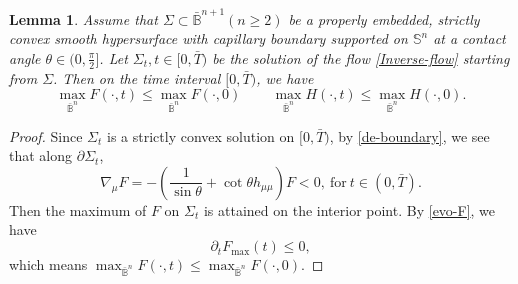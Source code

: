 \documentclass[11pt,reqno]{amsart}
\newtheorem{lem}[thm]{Lemma}
\theoremstyle{definition}
\theoremstyle{remark}
\numberwithin{equation}{section}
\renewcommand{\(}{\left(}
\renewcommand{\)}{\right)}
\renewcommand{\-}{\overline}
\begin{document}
\begin{lem}\label{upper-F-H}
	Assume that $\Sigma\subset\bar{\mathbb{B}}^{n+1} (n\geq 2)$ be a properly embedded, strictly convex smooth hypersurface with capillary boundary supported on $\mathbb{S}^n$ at a contact angle $\theta\in(0,\frac{\pi}{2}]$. Let $\Sigma_t,t\in[0,\bar{T})$ be the solution of the flow \eqref{Inverse-flow} starting from $\Sigma$. Then on the time interval $[0,\bar{T})$, we have
	\begin{equation}
		\max_{\bar{\mathbb{B}}^n} F(\cdot,t)\leq \max_{\bar{\mathbb{B}}^n} F(\cdot,0)\,\qquad \max_{\bar{\mathbb{B}}^n} H(\cdot,t)\leq \max_{\bar{\mathbb{B}}^n} H(\cdot,0).
	\end{equation}
\end{lem}
\begin{proof}
	Since $\Sigma_t$ is a strictly convex solution on $[0,\bar{T})$, by \eqref{de-boundary}, we see that along $\partial\Sigma_t$,
	\begin{equation}\label{de-F}
		\nabla_{\mu} F=-(\frac{1}{\sin\theta}+\cot\theta h_{\mu\mu})F<0, \ \text{for}\ t\in(0,\bar{T}). 
	\end{equation}
Then the maximum of $F$ on $\Sigma_t$ is attained on the interior point. By \eqref{evo-F}, we have
\begin{equation}
	\partial_t F_{\max}(t)\leq 0,
\end{equation}
which means $\max_{\bar{\mathbb{B}}^n} F(\cdot,t)\leq \max_{\bar{\mathbb{B}}^n} F(\cdot,0)$.


\end{proof}
\end{document}
